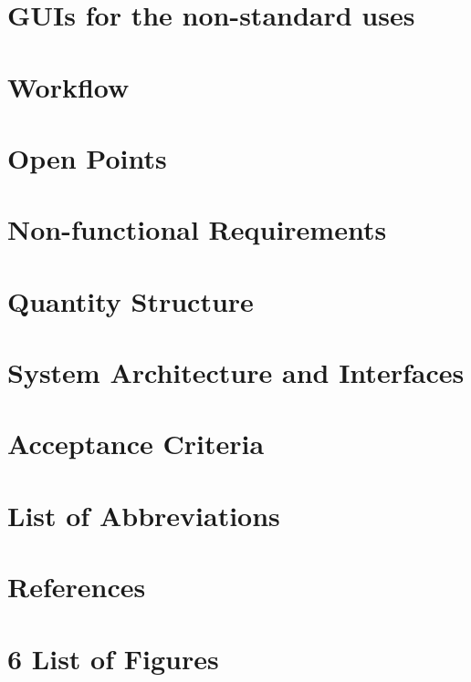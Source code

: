 \documentclass[12pt]{article}
\theoremstyle{definition}
\begin{document}
\section{GUIs for the non-standard uses}
\section{Workflow}
\section{Open Points}
\pagebreak
\section{Non-functional Requirements}
\pagebreak
\section{Quantity Structure}
\pagebreak
\section{System Architecture and Interfaces}
\pagebreak
\section{Acceptance Criteria}
\pagebreak
\section{List of Abbreviations}
\pagebreak
\section{References}
\pagebreak
\section{6	List of Figures}
\end{document}
